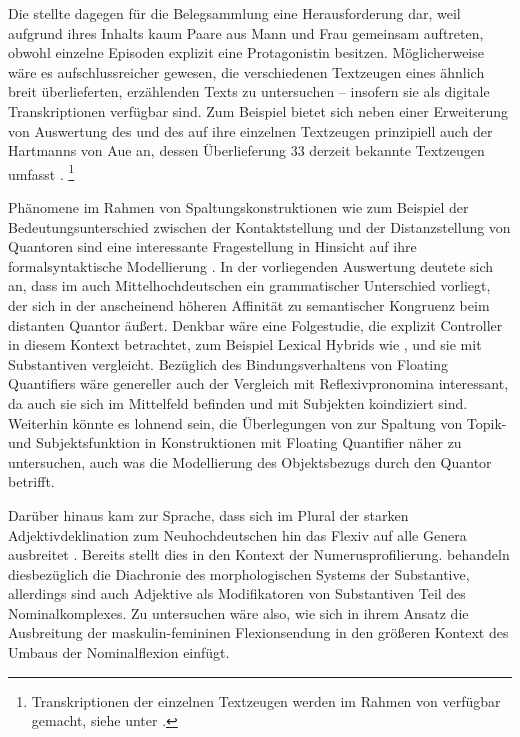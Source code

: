 Die \citet{kc} stellte dagegen für die Belegsammlung eine Herausforderung
dar, weil aufgrund ihres Inhalts kaum Paare aus Mann und Frau gemeinsam
auftreten, obwohl einzelne Episoden explizit eine Protagonistin besitzen.
Möglicherweise wäre es aufschlussreicher gewesen, die verschiedenen Textzeugen
eines ähnlich breit überlieferten, erzählenden Texts zu untersuchen -- insofern
sie als digitale Transkriptionen verfügbar sind. Zum Beispiel bietet sich neben
einer Erweiterung von  Auswertung des
 und des  auf ihre einzelnen Textzeugen prinzipiell
auch der  Hartmanns von Aue an, dessen Überlieferung 33 derzeit
bekannte Textzeugen umfasst \autocites[vgl.][s.\,v.~\textit{Hartmann von Aue:
}]{hsc}.%
%
	\footnote{Transkriptionen der einzelnen Textzeugen werden im Rahmen von
		 verfügbar gemacht, siehe unter
		.%
	}

Phänomene im Rahmen von Spaltungskonstruktionen wie zum Beispiel der
Bedeutungs\-unterschied zwischen der Kontaktstellung und der Distanzstellung
von Quantoren sind eine interessante Fragestellung in Hinsicht auf ihre
formal\-syntaktische Modellierung \autocite[siehe
z.\,B.][]{pittner1995,merchant1996,fanselowcavar2002,nolda2007,shen2019}. In
der vorliegenden Auswertung deutete sich an, dass im auch Mittelhochdeutschen
ein grammatischer Unterschied vorliegt, der sich in der anscheinend höheren
Affinität zu semantischer Kongruenz beim distanten Quantor äußert. Denkbar wäre
eine Folgestudie, die explizit  Controller in diesem Kontext
betrachtet, zum Beispiel Lexical Hybrids wie  ,
und sie mit  Substantiven vergleicht. Bezüglich des
Bindungsverhaltens von Floating Quantifiers wäre genereller auch der Vergleich
mit Reflexivpronomina interessant, da auch sie sich im Mittelfeld befinden und
mit Subjekten koindiziert sind. Weiterhin könnte es lohnend sein, die
Überlegungen von \citet{spector2009} zur Spaltung von Topik- und
Subjektsfunktion in Konstruktionen mit Floating Quantifier näher zu
untersuchen, auch was die Modellierung des Objektsbezugs durch den Quantor
betrifft.

Darüber hinaus kam zur Sprache, dass sich im Plural der starken
Adjektivdeklination zum Neuhochdeutschen hin das Flexiv  auf alle
Genera ausbreitet \autocite[vgl.][191--192]{reichmannwegera1993}. Bereits
\citet{askedal1973} stellt dies in den Kontext der Numerusprofilierung.
\citet{dammelgillmann2014} behandeln diesbezüglich die Diachronie des
morphologischen Systems der Substantive, allerdings sind auch Adjektive als
Modifikatoren von Substantiven Teil des Nominalkomplexes. Zu untersuchen wäre
also, wie sich in ihrem Ansatz die Ausbreitung der maskulin-femininen
Flexionsendung in den größeren Kontext des Umbaus der Nominal\-flexion einfügt.

